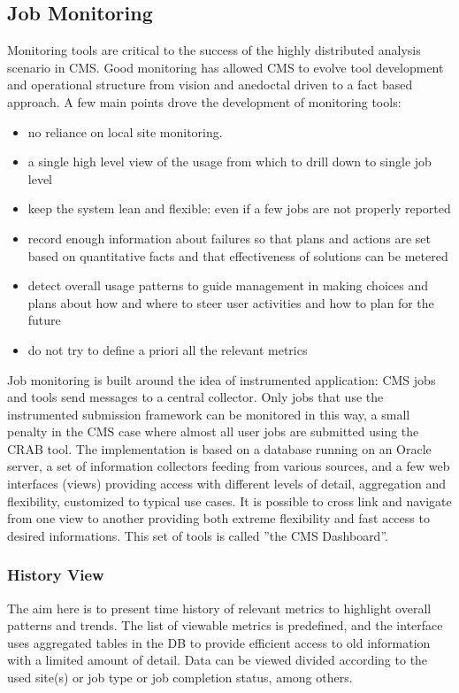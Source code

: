 \subsection{Job Monitoring}
\label{sec:3_3}
Monitoring tools are critical to the success of the
highly distributed analysis scenario in CMS.
Good monitoring has allowed CMS to evolve tool development
and operational structure from vision and anedoctal driven
to a fact based approach.
A few main points drove the development of monitoring tools:
\begin{itemize}
\item no reliance on local site monitoring.
\item a single  high level view of the usage from which
  to drill down to single job level
\item   keep the system lean and flexible: even if a few
  jobs are not properly reported
\item record
  enough information about failures so that plans and actions are set
  based on quantitative facts and that effectiveness of solutions can be metered
\item detect overall usage patterns to guide management in making
 choices and plans about how and where to steer user activities and
 how to plan for the future
\item do not try to define a priori all the relevant metrics
\end{itemize}

Job monitoring is built around the idea of instrumented
application: CMS jobs and tools send messages
to a central collector. Only jobs that use the
instrumented submission framework can be monitored in this way,
a small penalty in the CMS case where almost
all user jobs are submitted using the CRAB tool.
The implementation is based on a
database running on an Oracle server, a set of information collectors
feeding from various sources, 
and a few web interfaces (views) providing access with different levels
of detail, aggregation and flexibility, customized to
typical use cases. It is possible to cross link and navigate
from one view to another providing both extreme flexibility
and fast access to desired informations.
This set of tools is called ''the CMS Dashboard''.

\subsubsection{History View}
The aim here is to present time history of relevant
metrics to highlight overall patterns and trends.
The list of viewable metrics is predefined, and
the interface uses aggregated tables in the DB to provide
efficient access to old information with a limited
amount of detail. Data can be viewed divided
according to the used site(s) or job type or job completion status, among others.

